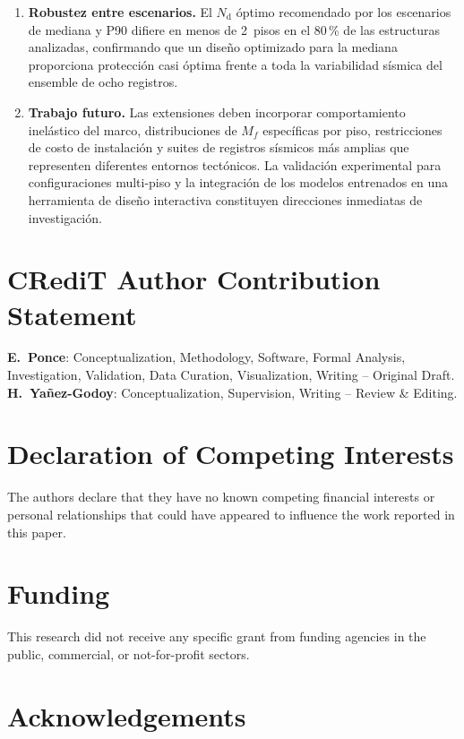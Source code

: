 \documentclass[preprint,12pt,authoryear]{elsarticle}
\newcommand{\nd}{N_{\mathrm{d}}}
\newcommand{\Mf}{M_{\!f}}
\begin{document}
\begin{enumerate}
\item \textbf{Robustez entre escenarios.}
El $\nd$ óptimo recomendado por los escenarios de mediana y P90 difiere en menos
de 2~pisos en el 80\,\% de las estructuras analizadas, confirmando que un diseño
optimizado para la mediana proporciona protección casi óptima frente a toda la
variabilidad sísmica del ensemble de ocho registros.

\item \textbf{Trabajo futuro.}
Las extensiones deben incorporar comportamiento inelástico del marco,
distribuciones de $\Mf$ específicas por piso, restricciones de costo de
instalación y suites de registros sísmicos más amplias que representen diferentes
entornos tectónicos. La validación experimental para configuraciones multi-piso
y la integración de los modelos entrenados en una herramienta de diseño
interactiva constituyen direcciones inmediatas de investigación.

\end{enumerate}

\section*{CRediT Author Contribution Statement}

\textbf{E.~Ponce}: Conceptualization, Methodology, Software, Formal Analysis,
Investigation, Validation, Data Curation, Visualization, Writing -- Original Draft.
\textbf{H.~Yañez-Godoy}: Conceptualization, Supervision, Writing -- Review \& Editing.

\section*{Declaration of Competing Interests}

The authors declare that they have no known competing financial interests or
personal relationships that could have appeared to influence the work reported
in this paper.

\section*{Funding}

This research did not receive any specific grant from funding agencies in the
public, commercial, or not-for-profit sectors.

\section*{Acknowledgements}
\end{document}
